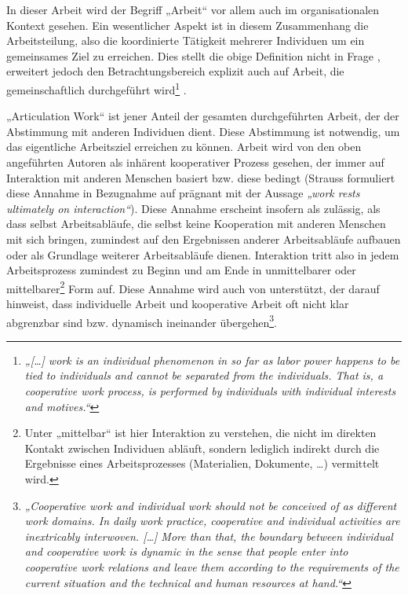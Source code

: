 In dieser Arbeit wird der Begriff „Arbeit“ vor allem auch im organisationalen Kontext gesehen. Ein wesentlicher Aspekt ist in diesem Zusammenhang die Arbeitsteilung, also die koordinierte Tätigkeit mehrerer Individuen um ein gemeinsames Ziel zu erreichen. Dies stellt die obige Definition nicht in Frage \citep{Schmidt94}, erweitert jedoch den Betrachtungsbereich explizit auch auf Arbeit, die gemeinschaftlich durchgeführt wird\footnote{\emph{„[\ldots] work is an individual phenomenon in so far as labor power happens to be tied to individuals and cannot be separated from the individuals. That is, a cooperative work process, is performed by individuals with individual interests and motives.“}\citep[][S. 353 ]{Schmidt94}} . 

„Articulation Work“ ist jener Anteil der gesamten durchgeführten Arbeit, der der Abstimmung mit anderen Individuen dient. Diese Abstimmung ist notwendig, um das eigentliche Arbeitsziel erreichen zu können. Arbeit wird von den oben angeführten Autoren als inhärent kooperativer Prozess gesehen, der immer auf Interaktion mit anderen Menschen basiert bzw. diese bedingt (Strauss formuliert diese Annahme in Bezugnahme auf \citet{Hughes71} prägnant mit der Aussage \emph{„work rests ultimately on interaction“}). Diese Annahme erscheint insofern als zulässig, als dass selbst Arbeitsabläufe, die selbst keine Kooperation mit anderen Menschen mit sich bringen, zumindest auf den Ergebnissen anderer Arbeitsabläufe aufbauen oder als Grundlage weiterer Arbeitsabläufe dienen. Interaktion tritt also in jedem Arbeitsprozess zumindest zu Beginn und am Ende in unmittelbarer oder mittelbarer\footnote{Unter „mittelbar“ ist hier Interaktion zu verstehen, die nicht im direkten Kontakt zwischen Individuen abläuft, sondern lediglich indirekt durch die Ergebnisse eines Arbeitsprozesses (Materialien, Dokumente, \ldots) vermittelt wird.} Form auf. Diese Annahme wird  auch von \citet{Schmidt94} unterstützt, der darauf hinweist, dass individuelle Arbeit und kooperative Arbeit oft nicht klar abgrenzbar sind bzw. dynamisch ineinander übergehen\footnote{\emph{„Cooperative work and individual work should not be conceived of as different work domains. In daily work practice, cooperative and individual activities are inextricably interwoven. [\ldots] More than that, the boundary between individual and cooperative work is dynamic in the sense that people enter into cooperative work relations and leave them according to the requirements of the current situation and the technical and human resources at hand.“}\citep[][S. 352]{Schmidt94}}.

